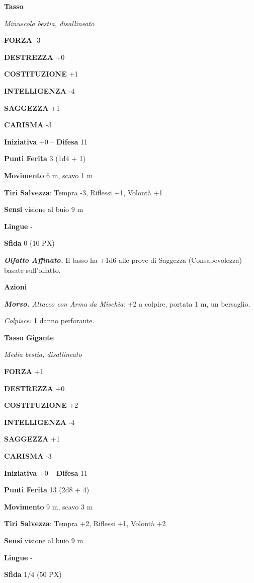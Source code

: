 \begin{multicols}{2}
\medskip\textbf{Tasso}

\textit{Minuscola bestia, disallineato}

\textbf{FORZA} -3

\textbf{DESTREZZA} +0

\textbf{COSTITUZIONE} +1

\textbf{INTELLIGENZA} -4

\textbf{SAGGEZZA} +1

\textbf{CARISMA} -3

\textbf{Iniziativa} +0 -- \textbf{Difesa} 11

\textbf{Punti Ferita} 3 (1d4 + 1)

\textbf{Movimento} 6 m, scavo 1 m

\textbf{Tiri Salvezza}: Tempra -3, Riflessi +1, Volontà +1

\textbf{Sensi} visione al buio 9 m

\textbf{Lingue} -

\textbf{Sfida} 0 (10 PX)

\textit{\textbf{Olfatto Affinato.}} Il tasso ha +1d6 alle prove di Saggezza (Consapevolezza) basate sull'olfatto.

\textbf{Azioni}

\textit{\textbf{Morso.} Attacco con Arma da Mischia}: +2 a colpire, portata 1 m, un bersaglio.

\textit{Colpisce:} 1 danno perforante.

\medskip\textbf{Tasso Gigante}

\textit{Media bestia, disallineato}

\textbf{FORZA} +1

\textbf{DESTREZZA} +0

\textbf{COSTITUZIONE} +2

\textbf{INTELLIGENZA} -4

\textbf{SAGGEZZA} +1

\textbf{CARISMA} -3

\textbf{Iniziativa} +0 -- \textbf{Difesa} 11

\textbf{Punti Ferita} 13 (2d8 + 4)

\textbf{Movimento} 9 m, scavo 3 m

\textbf{Tiri Salvezza}: Tempra +2, Riflessi +1, Volontà +2

\textbf{Sensi} visione al buio 9 m

\textbf{Lingue} -

\textbf{Sfida} 1/4 (50 PX)


\end{multicols}
